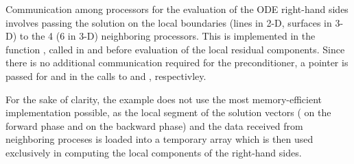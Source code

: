 Communication among processors for the evaluation of the ODE right-hand sides involves
passing the solution on the local boundaries (lines in 2-D, surfaces in 3-D) to 
the 4 (6 in 3-D) neighboring processors. This is implemented in the function 
, called in  and  before evaluation of the local residual 
components. Since there is no additional communication required for the {\cvbbdpre}
preconditioner, a  pointer is passed for  and  in the
calls to  and , respectivley.

For the sake of clarity, the  example does not use the most 
memory-efficient implementation possible, as the local segment of the 
solution vectors ( on the forward phase and  on the backward phase)
and the data received from neighboring proceses is loaded into a temporary 
array  which is then used exclusively in computing the local components
of the right-hand sides.

